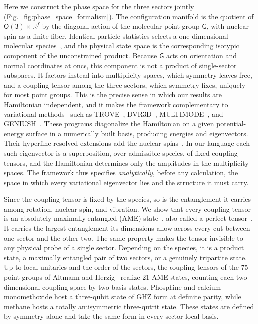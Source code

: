 \documentclass[
  reprint,
  aps,
  prx,
  superscriptaddress,
  amsmath,
  amssymb,
  longbibliography
]{revtex4-2}
\newcommand{\grp}[1]{\mathsf{#1}}
\begin{document}
Here we construct the phase space for the three sectors jointly (Fig.~\ref{fig:phase_space_formalism}). The configuration manifold is the quotient of $\grp{O(3)}\times\mathbb R^{f}$ by the diagonal action of the molecular point group $\grp{G}$, with nuclear spin as a finite fiber. Identical-particle statistics selects a one-dimensional molecular species~\cite{BunkerJensen2006}, and the physical state space is the corresponding isotypic component of the unconstrained product. Because $\grp{G}$ acts on orientation and normal coordinates at once, this component is not a product of single-sector subspaces. It factors instead into multiplicity spaces, which symmetry leaves free, and a coupling tensor among the three sectors, which symmetry fixes, uniquely for most point groups. This is the precise sense in which our results are Hamiltonian independent, and it makes the framework complementary to variational methods~\cite{Carrington2017} such as TROVE~\cite{Yurchenko_2017, Chubb2018, Yurchenko2007, Tennyson2016}, DVR3D~\cite{Tennyson2004}, MULTIMODE~\cite{Bowman2003}, and GENIUSH~\cite{Fabri2011}. These programs diagonalize the Hamiltonian on a given potential-energy surface in a numerically built basis, producing energies and eigenvectors. Their hyperfine-resolved extensions add the nuclear spins~\cite{YachmenevKupper2017, OwensYachmenev2018, Coles2019, Yachmenev2022}. In our language each such eigenvector is a superposition, over admissible species, of fixed coupling tensors, and the Hamiltonian determines only the amplitudes in the multiplicity spaces. The framework thus specifies \textit{analytically}, before any calculation, the space in which every variational eigenvector lies and the structure it must carry.

Since the coupling tensor is fixed by the species, so is the entanglement it carries among rotation, nuclear spin, and vibration. We show that every coupling tensor is an absolutely maximally entangled (AME) state~\cite{Helwig2012}, also called a perfect tensor~\cite{Pastawski2015}. It carries the largest entanglement its dimensions allow across every cut between one sector and the other two. The same property makes the tensor invisible to any physical probe of a single sector. Depending on the species, it is a product state, a maximally entangled pair of two sectors, or a genuinely tripartite state. Up to local unitaries and the order of the sectors, the coupling tensors of the 75 point groups of Altmann and Herzig~\cite{AltmannHerzig2011} realize 21 AME states, counting each two-dimensional coupling space by two basis states. Phosphine and calcium monomethoxide host a three-qubit state of GHZ form at definite parity, while methane hosts a totally antisymmetric three-qutrit state. These states are defined by symmetry alone and take the same form in every sector-local basis.
\end{document}
